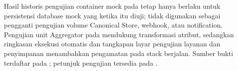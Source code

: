 Hasil historis pengujian container mock pada
 tetap hanya berlaku untuk persistensi database mock yang
ketika itu diuji; tidak digunakan sebagai pengganti pengujian volume
Canonical Store, webhook, atau notification. Pengujian unit Aggregator
pada 
mendukung transformasi atribut, sedangkan ringkasan eksekusi otomatis dan
tangkapan layar pengujian layanan dan penyimpanan menambahkan pengamatan
pada stack berjalan. Sumber bukti terdaftar pada
; petunjuk pengujian tersedia pada
.
